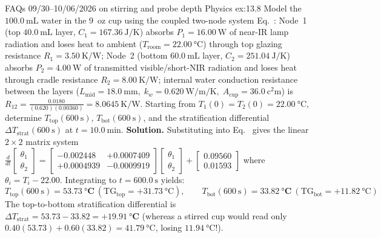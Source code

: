 \begin{workedexample}{FAQs 09/30--10/06/2026 on stirring and probe depth Physics }{ex:13.8}
Model the $\SI{100.0}{\milli\liter}$ water in the 9~oz cup using the coupled two-node system Eq.~: Node~1 (top $\SI{40.0}{\milli\liter}$ layer, $C_1 = \SI{167.36}{\joule\per\kelvin}$) absorbs $P_1 = \SI{16.00}{\watt}$ of near-IR lamp radiation and loses heat to ambient ($T_{\mathrm{room}} = \SI{22.00}{\celsius}$) through top glazing resistance $R_1 = \SI{3.50}{\kelvin\per\watt}$; Node~2 (bottom $\SI{60.0}{\milli\liter}$ layer, $C_2 = \SI{251.04}{\joule\per\kelvin}$) absorbs $P_2 = \SI{4.00}{\watt}$ of transmitted visible/short-NIR radiation and loses heat through cradle resistance $R_2 = \SI{8.00}{\kelvin\per\watt}$; internal water conduction resistance between the layers ($L_{\mathrm{mid}} = \SI{18.0}{\milli\meter},\; k_w = \SI{0.620}{\watt\per\meter\per\kelvin},\; A_{\mathrm{cup}} = \SI{36.0}{\square\centi\meter}$) is $R_{12} = \frac{0.0180}{(0.620)(0.00360)} = \SI{8.0645}{\kelvin\per\watt}$. Starting from $T_1(0) = T_2(0) = \SI{22.00}{\celsius}$, determine $T_{\mathrm{top}}(\SI{600}{\second})$, $T_{\mathrm{bot}}(\SI{600}{\second})$, and the stratification differential $\Delta T_{\mathrm{strat}}(\SI{600}{\second})$ at $t = \SI{10.0}{\minute}$.
\tcblower
\textbf{Solution.} Substituting into Eq.~ gives the linear $2\times 2$ matrix system $\frac{d}{dt}\begin{bmatrix}\theta_1 \\ \theta_2\end{bmatrix} = \begin{bmatrix}-0.002448 & +0.0007409 \\ +0.0004939 & -0.0009919\end{bmatrix}\begin{bmatrix}\theta_1 \\ \theta_2\end{bmatrix} + \begin{bmatrix}0.09560 \\ 0.01593\end{bmatrix}$ where $\theta_i = T_i - 22.00$. Integrating to $t = \SI{600.0}{\second}$ yields:
\[
  T_{\mathrm{top}}(\SI{600}{\second}) = \mathbf{\SI{53.73}{\celsius}}\ (\mathrm{TG}_{\mathrm{top}} = +\SI{31.73}{\celsius}), \qquad
  T_{\mathrm{bot}}(\SI{600}{\second}) = \mathbf{\SI{33.82}{\celsius}}\ (\mathrm{TG}_{\mathrm{bot}} = +\SI{11.82}{\celsius})
\]
The top-to-bottom stratification differential is $\Delta T_{\mathrm{strat}} = 53.73 - 33.82 = \mathbf{+\SI{19.91}{\celsius}}$ (whereas a stirred cup would read only $0.40(53.73) + 0.60(33.82) = \SI{41.79}{\celsius}$, losing $\SI{11.94}{\celsius}$!).
\end{workedexample}

